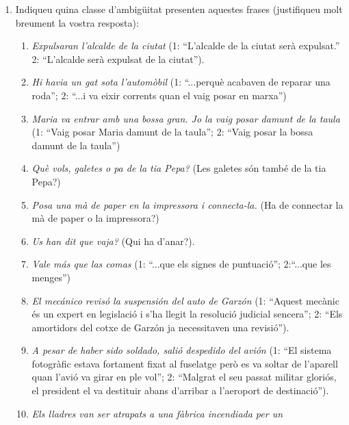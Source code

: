 \begin{enumerate}
\item Indiqueu quina classe d'ambigüitat presenten aquestes frases
  (justifiqueu molt breument la vostra resposta): 
  \begin{enumerate}
  \item \emph{Expulsaran l'alcalde de la ciutat} (1: ``L'alcalde de la
    ciutat serà expulsat.''  2: ``L'alcalde serà expulsat de la
    ciutat'').
  \item \emph{Hi havia un gat sota l'automòbil} (1: ``...perquè
    acabaven de reparar una roda''; 2: ``...i va eixir corrents quan
    el vaig posar en marxa'')
  \item \emph{Maria va entrar amb una bossa gran. Jo la vaig posar
      damunt de la taula} (1: ``Vaig posar Maria damunt de la taula'';
    2: ``Vaig posar la bossa damunt de la taula'')
  \item \emph{Què vols, galetes o pa de la tia Pepa?} (Les galetes són
    també de la tia Pepa?)
  \item \emph{Posa una mà de paper en la impressora i connecta-la.}
    (Ha de connectar la mà de paper o la impressora?)
  \item \emph{Us han dit que vaja?} (Qui ha d'anar?).
  \item \emph{Vale más que las comas} (1: ``...que els signes de
    puntuació''; 2:``...que les menges'')
  \item \emph{El mecánico revisó la suspensión del auto de Garzón} (1:
    ``Aquest mecànic és un expert en legislació i s'ha llegit la
    resolució judicial sencera''; 2: ``Els amortidors del cotxe de
    Garzón ja necessitaven una revisió'').
  \item \emph{A pesar de haber sido soldado, salió despedido del
      avión} (1: ``El sistema fotogràfic estava fortament fixat al
    fuselatge però es va soltar de l'aparell quan l'avió va girar en
    ple vol''; 2: ``Malgrat el seu passat militar gloriós, el
    president el va destituir abans d'arribar a l'aeroport de
    destinació'').
  \item \emph{Els lladres van ser atrapats a una fàbrica incendiada per un
}
\end{enumerate}
\end{enumerate}
